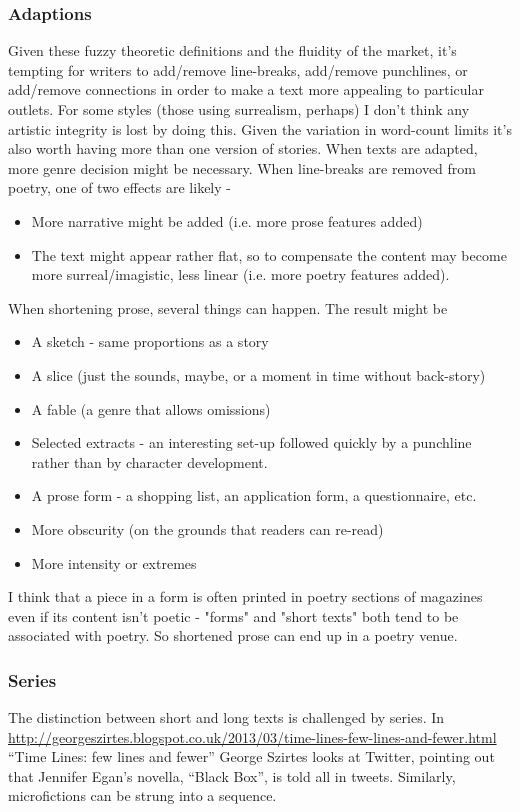 \documentclass[11pt]{article}
\begin{document}
\subsubsection*{Adaptions}
Given these fuzzy theoretic definitions and the fluidity of the market, it's tempting for writers to add/remove line-breaks, add/remove punchlines, or add/remove connections in order to make a text more appealing to particular outlets. For some styles (those using surrealism, perhaps) I don't think any artistic integrity is lost by doing this. Given the variation in word-count limits it's also worth having more than one version of stories. When  texts are adapted, more genre decision might be necessary. When line-breaks are removed from poetry, one of two effects are likely - 
\begin{itemize}
\item More narrative might be added (i.e. more prose features added) 
\item The text might appear rather flat, so to compensate the content may become more surreal/imagistic, less linear (i.e. more poetry features added).
\end{itemize}

When shortening prose, several things can happen. The result might be
\begin{itemize}
 \item A sketch - same proportions as a story
 \item A slice (just the sounds, maybe, or a moment in time without back-story)
 \item A fable (a genre that allows omissions)
 \item Selected extracts - an interesting set-up followed quickly by a punchline rather than by character development.
 \item A prose form - a shopping list, an application form, a questionnaire, etc.
\item More obscurity (on the grounds that readers can re-read)
\item More intensity or extremes
\end{itemize}
I think that a piece in a form is often printed in poetry sections of magazines even if its content isn't poetic - "forms" and "short texts" both tend to be associated with poetry. So shortened prose can end up in a poetry venue.

\subsubsection*{Series}
The distinction between short and long texts is challenged by series. In \url{http://georgeszirtes.blogspot.co.uk/2013/03/time-lines-few-lines-and-fewer.html} ``Time Lines: few lines and fewer'' George Szirtes looks at Twitter, pointing out that 
Jennifer Egan's novella, ``Black Box'', is told all in tweets. Similarly, microfictions can be strung into a sequence.
\end{document}
